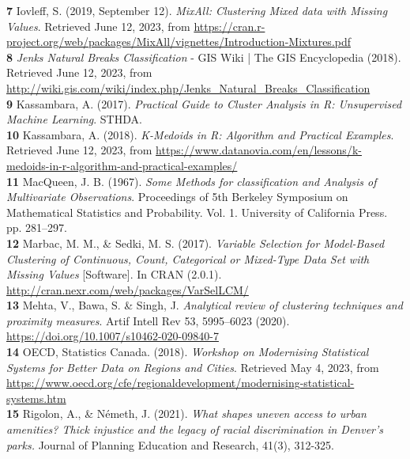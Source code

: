 \documentclass[11pt, a4paper]{article}
\begin{document}
\noindent\textbf{7} Iovleff, S. (2019, September 12). \textit{MixAll: Clustering Mixed data with Missing Values}. Retrieved June 12, 2023, from \sloppy\url{https://cran.r-project.org/web/packages/MixAll/vignettes/Introduction-Mixtures.pdf} \\

\noindent\textbf{8} \textit{Jenks Natural Breaks Classification} - GIS Wiki | The GIS Encyclopedia (2018). Retrieved June 12, 2023, from \sloppy\url{http://wiki.gis.com/wiki/index.php/Jenks_Natural_Breaks_Classification} \\

\noindent\textbf{9} Kassambara, A. (2017). \textit{Practical Guide to Cluster Analysis in R: Unsupervised Machine Learning}. STHDA. \\

\noindent\textbf{10} Kassambara, A. (2018). \textit{K-Medoids in R: Algorithm and Practical Examples}. Retrieved June 12, 2023, from \sloppy\url{https://www.datanovia.com/en/lessons/k-medoids-in-r-algorithm-and-practical-examples/} \\

\noindent\textbf{11} MacQueen, J. B. (1967). \textit{Some Methods for classification and Analysis of Multivariate Observations}. Proceedings of 5th Berkeley Symposium on Mathematical Statistics and Probability. Vol. 1. University of California Press. pp. 281–297. \\

\noindent\textbf{12} Marbac, M. M., \& Sedki, M. S. (2017). \textit{Variable Selection for Model-Based Clustering of Continuous, Count, Categorical or Mixed-Type Data Set with Missing Values} [Software]. In CRAN (2.0.1). \sloppy\url{ http://cran.nexr.com/web/packages/VarSelLCM/} \\

\noindent\textbf{13} Mehta, V., Bawa, S. \& Singh, J. \textit{Analytical review of clustering techniques and proximity measures}. Artif Intell Rev 53, 5995–6023 (2020). \sloppy\url{https://doi.org/10.1007/s10462-020-09840-7} \\

\noindent\textbf{14} OECD, Statistics Canada. (2018). \textit{Workshop on Modernising Statistical Systems for Better Data on Regions and Cities}.  Retrieved May 4, 2023, from \sloppy\url{https://www.oecd.org/cfe/regionaldevelopment/modernising-statistical-systems.htm} \\

\noindent\textbf{15} Rigolon, A., \& Németh, J. (2021). \textit{What shapes uneven access to urban amenities? Thick injustice and the legacy of racial discrimination in Denver’s parks.} Journal of Planning Education and Research, 41(3), 312-325. \\
\end{document}
